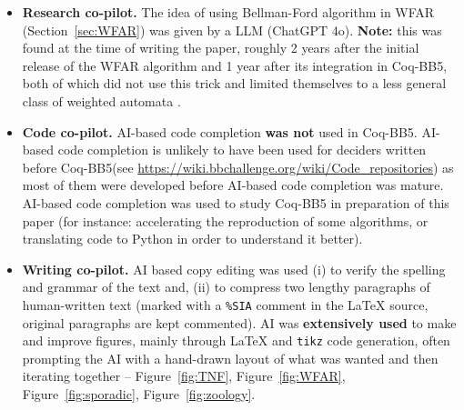 \documentclass[a4paper,british]{article}
\theoremstyle{definition} %
\numberwithin{equation}{section}
\theoremstyle{definition} %
\newcommand{\CoqBB}{Coq-BB5\xspace}
\begin{document}
\begin{itemize}
    \item \textbf{Research co-pilot.} The idea of using Bellman-Ford algorithm in WFAR (Section~\ref{sec:WFAR}) was given by a LLM (ChatGPT 4o). \textbf{Note:} this was found at the time of writing the paper, roughly 2 years after the initial release of the WFAR algorithm and 1 year after its integration in \CoqBB, both of which did not use this trick and limited themselves to a less general class of weighted automata \cite{iijil1_2025_14914502}.
    \item \textbf{Code co-pilot.} AI-based code completion \textbf{was not} used in \CoqBB. AI-based code completion is unlikely to have been used for deciders written before \CoqBB (see \url{https://wiki.bbchallenge.org/wiki/Code_repositories}) as most of them were developed before AI-based code completion was mature. AI-based code completion was used to study \CoqBB in preparation of this paper (for instance: accelerating the reproduction of some algorithms, or translating \Coq code to Python in order to understand it better).
    \item \textbf{Writing co-pilot.} AI based copy editing was used (i) to verify the spelling and grammar of the text and, (ii) to compress two lengthy paragraphs of human-written text (marked with a \texttt{\%SIA} comment in the LaTeX source, original paragraphs are kept commented). AI was \textbf{extensively used} to make and improve figures, mainly through LaTeX and \texttt{tikz} code generation, often prompting the AI with a hand-drawn layout of what was wanted and then iterating together -- \eg Figure~\ref{fig:TNF}, Figure~\ref{fig:WFAR}, Figure~\ref{fig:sporadic}, Figure~\ref{fig:zoology}.

\end{itemize}
\end{document}
